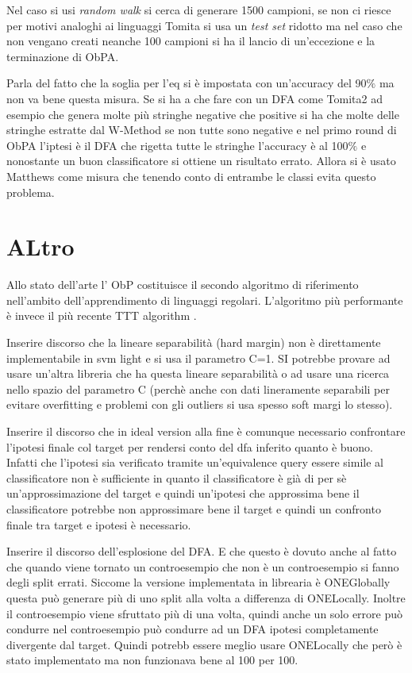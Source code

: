 Nel caso si usi \textit{random walk} si cerca di generare 1500 campioni, se non ci riesce per motivi analoghi ai linguaggi Tomita si usa un \textit{test set} ridotto ma nel caso che non vengano creati neanche 100 campioni si ha il lancio di un'eccezione e la terminazione di \ac{ObPA}.


Parla del fatto che la soglia per l'eq si è impostata con un'accuracy del 90$\%$ ma non va bene questa misura. Se si ha a che fare con un \ac{DFA} come Tomita2 ad esempio che genera molte più stringhe negative che positive si ha che molte delle stringhe estratte dal W-Method se non tutte sono negative e nel primo round di \ac{ObPA} l'iptesi è il DFA che rigetta tutte le stringhe l'accuracy è al 100$\%$ e nonostante un buon classificatore si ottiene un risultato errato. Allora si è usato Matthews come misura che tenendo conto di entrambe le classi evita questo problema.

\section{ALtro}
Allo stato dell'arte l' \ac{ObP} costituisce il secondo algoritmo di riferimento nell'ambito dell'apprendimento di linguaggi regolari.  L'algoritmo più performante è invece il più recente TTT algorithm \cite{SteffenTTT14}.

Inserire discorso che la lineare separabilità (hard margin) non è direttamente implementabile in svm light e si usa il parametro C=1. SI potrebbe provare ad usare un'altra libreria che ha questa lineare separabilità  o ad usare una ricerca nello spazio del parametro C (perchè anche con dati lineramente separabili per evitare overfitting e problemi con gli outliers si usa spesso soft margi lo stesso).

Inserire il discorso che in ideal version alla fine è comunque necessario confrontare l'ipotesi finale col target per rendersi conto del dfa inferito quanto è buono. Infatti che l'ipotesi sia verificato tramite un'equivalence query essere simile al classificatore non è sufficiente in quanto il classificatore è già di per sè un'approssimazione del target e quindi un'ipotesi che approssima bene il classificatore potrebbe non approssimare bene il target e quindi un confronto finale tra target e ipotesi è necessario. 

Inserire il discorso dell'esplosione del DFA. E che questo è dovuto anche al fatto che quando viene tornato un controesempio che non è un controesempio si fanno degli split errati. Siccome la versione implementata in librearia è ONEGlobally questa può generare più di uno split alla volta a differenza di ONELocally. Inoltre il controesempio viene sfruttato più di una volta, quindi anche un solo errore può condurre nel controesempio può condurre ad un DFA ipotesi completamente divergente dal target. Quindi potrebb essere meglio usare ONELocally che però è stato implementato ma non funzionava bene al 100 per 100.

